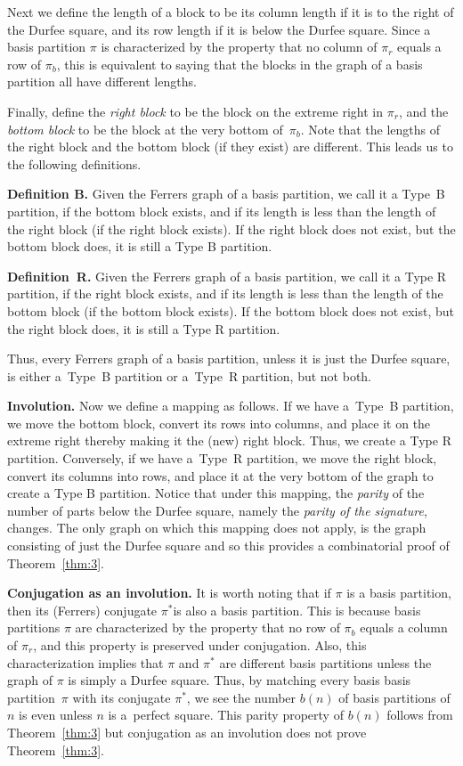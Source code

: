 \documentclass[pdftex]{sigma}
\numberwithin{equation}{section}
\theoremstyle{definition}
\begin{document}
Next we define the length of a block to be its column length if it is
to the right of the Durfee square, and its row length if it is below
the Durfee square. Since a basis partition $\pi$ is characterized by the
property that no column of $\pi_r$ equals a row of $\pi_b$, this is
equivalent to saying that the blocks in the graph of a basis partition
all have different lengths.

Finally, define the {\it right block} to be the block on the extreme
right in $\pi_r$, and the {\it bottom block} to be the block at the
very bottom of~$\pi_b$. Note that the lengths of the right block and
the bottom block (if they exist) are different. This leads us to the following definitions.

{\bf Definition B.} Given the Ferrers graph of a basis partition, we call
it a Type~B partition, if the bottom block exists, and if its length is
less than the length of the right block (if the right block exists).
If the right block does not exist, but the bottom block does, it is
still a Type B partition.

{\bf Definition~R.} Given the Ferrers graph of a basis partition, we call
it a Type R partition, if the right block exists, and if its length is
less than the length of the bottom block (if the bottom block exists).
If the bottom block does not exist, but the right block does, it is
still a Type R partition.

Thus, every Ferrers graph of a basis partition, unless it is just the
Durfee square, is either a~Type~B partition or a~Type~R partition, but
not both.

{\bf Involution.} Now we define a mapping as follows. If we have
a~Type~B partition,
we move the bottom block, convert its rows into columns, and place it
on the extreme right thereby making it the (new) right block. Thus, we
create a Type R partition. Conversely, if we have a~Type~R partition,
we move the right block, convert its columns into rows, and place it
at the very bottom of the graph to create a Type B partition. Notice
that under this mapping, the {\it parity} of the number of parts below
the Durfee square, namely the {\it parity of the signature}, changes. The
only graph on which this mapping does not apply, is the graph consisting
of just the Durfee square and so this provides a combinatorial proof of
Theorem~\ref{thm:3}.

{\bf Conjugation as an involution.} It is worth noting that if $\pi$ is
a basis partition, then its (Ferrers) conjugate $\pi^*$is also a basis
partition. This is because basis partitions $\pi$ are characterized by
the property that no row of $\pi_b$ equals a column of $\pi_r$, and this
property is preserved under conjugation. Also, this characterization
implies that $\pi$ and $\pi^*$ are different basis partitions unless
the graph of $\pi$ is simply a Durfee square. Thus, by matching every basis
basis partition~$\pi$ with its conjugate $\pi^*$, we see the number
$b(n)$ of basis partitions of $n$ is even unless $n$ is a~perfect square.
This parity property of $b(n)$ follows from Theorem~\ref{thm:3} but conjugation
as an involution does not prove Theorem~\ref{thm:3}.
\end{document}

